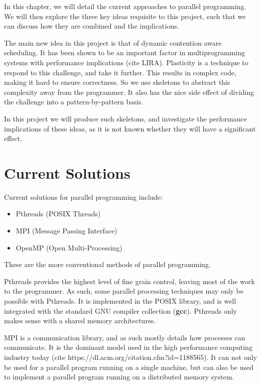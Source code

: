 
In this chapter, we will detail the current approaches to parallel programming. We will then explore the three key ideas requisite to this project, such that we can discuss how they are combined and the implications.

The main new idea in this project is that of dynamic contention aware scheduling. It has been shown to be an important factor in multiprogramming systems with performance implications (cite LIRA). Plasticity is a technique to respond to this challenge, and take it further. This results in complex code, making it hard to ensure correctness. So we use skeletons to abstract this complexity away from the programmer. It also has the nice side effect of dividing the challenge into a pattern-by-pattern basis.

In this project we will produce such skeletons, and investigate the performance implications of these ideas, as it is not known whether they will have a significant effect.



\section{Current Solutions}

Current solutions for parallel programming include:

\begin{itemize}
	\item Pthreads (POSIX Threads)
	\item MPI 	   (Message Passing Interface)
	\item OpenMP   (Open Multi-Processing)
\end{itemize}

These are the more conventional methods of parallel programming.

Pthreads provides the highest level of fine grain control, leaving most of the work to the programmer. As such, some parallel processing techniques may only be possible with Pthreads. It is implemented in the POSIX library, and is well integrated with the standard GNU compiler collection (\textbf{gcc}). Pthreads only makes sense with a shared memory architectures.

MPI is a communication library, and as such mostly details how processes can communicate. It is the dominant model used in the high performance computing industry today (cite https://dl.acm.org/citation.cfm?id=1188565). It can not only be used for a parallel program running on a single machine, but can also be used to implement a parallel program running on a distributed memory system.

